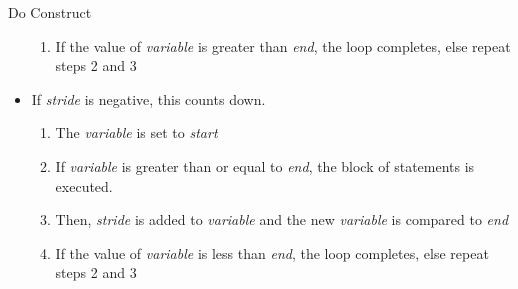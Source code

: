 \documentclass[10pt,t]{beamer}
\begin{document}
\begin{frame}{Do Construct}
\begin{itemize}
\begin{enumerate}
      \item If the value of \textit{variable} is greater than \textit{end}, the  loop completes, else repeat steps 2 and 3
    \end{enumerate}
    \item If \textit{stride} is negative, this  counts down.
    \begin{enumerate}
      \scriptsize
      \item The \textit{variable} is set to \textit{start}
      \item If \textit{variable} is greater than or equal to \textit{end}, the block of statements is executed.
      \item Then, \textit{stride} is added to \textit{variable} and the new \textit{variable} is compared to \textit{end}
      \item If the value of \textit{variable} is less than \textit{end}, the  loop completes, else repeat steps 2 and 3
    \end{enumerate}
  \end{itemize}
\end{frame}
\end{document}
